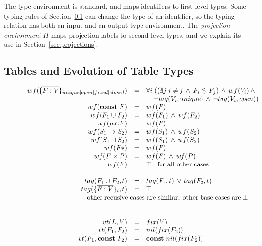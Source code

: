 \documentclass[preprint]{sigplanconf}
\begin{document}
The type environment is standard, and maps
identifiers to first-level types. Some typing rules of
Section~\ref{sec:tables} can change the type of an identifier,
so the typing relation has both an input and an output type
environment. The {\em projection environment} $\Pi$ maps projection labels to second-level types, and we explain
its use in Section~\ref{sec:projections}.

\subsection{Tables and Evolution of Table Types}
\label{sec:tables}

\begin{figure*}
	{\small
	\[
	\begin{array}{rcl}
	wf(\{\overline{F:V}\}_{unique|open|fixed|closed}) & = & \forall i \; ((\nexists j \; i \not= j \,\wedge\, F_{i} \lesssim F_{j}) \,\wedge\, wf(V_{i}) \,\wedge\\
	& & \;\;\;\; \lnot tag(V_{i},unique) \,\wedge\, \lnot tag(V_{i},open))\\
	wf({\bf const}\; F) & = & wf(F) \\
	wf(F_1 \cup F_2) & = & wf(F_1) \,\wedge\, wf(F_2) \\
	wf(\mu x.F) & = & wf(F) \\
	wf(S_1 \rightarrow S_2) & = & wf(S_1) \,\wedge\, wf(S_2) \\
	wf(S_1 \sqcup S_2) & = & wf(S_1) \,\wedge\, wf(S_2)\\
	wf(F{*}) &=& wf(F) \\
	wf(F \times P) &=& wf(F) \,\wedge\,wf(P)\\
	wf(F) & = & \top \;\;\;\mathrm{for\; all\; other\; cases}\\\\
	tag(F_1 \cup F_2, t) & = & tag(F_1, t) \,\vee\, tag(F_2,t) \\
	tag(\{\overline{F:V}\}_t, t) & = & \top\\
	\multicolumn{3}{c}{
		\;\;\;\;\;\;\;\;\;\;\;\;\;\;\;\;\;\;\;\;\;\;\;\;\;\;\mathrm{other\;recusive\;cases\;are\;similar,\;other\;base\;cases\;are\;}\bot}\\
\\\\
    vt(L, V) & = & fix(V) \\
    vt(F_1, F_2) & = & nil(fix(F_2))\\
    vt(F_1, {\bf const}\;F_2) & = & {\bf const}\;nil(fix(F_2))\\\\

\end{array}\]}
\end{figure*}
\end{document}
